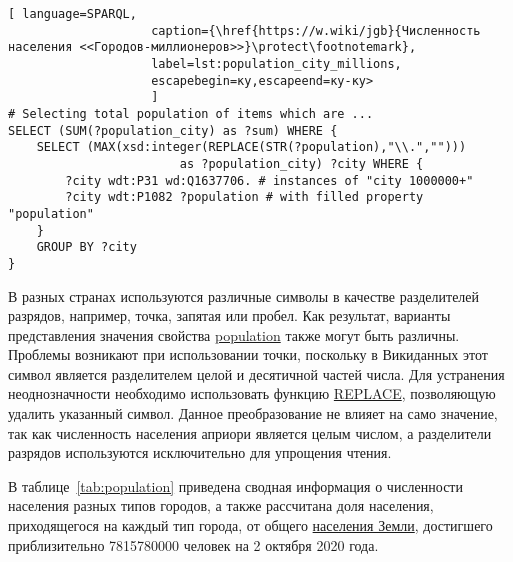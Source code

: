\newpage %

\begin{lstlisting}[ language=SPARQL, 
                    caption={\href{https://w.wiki/jgb}{Численность населения <<Городов-миллионеров>>}\protect\footnotemark},
                    label=lst:population_city_millions, 
                    escapebegin=ку,escapeend=ку-ку>
                    ]
# Selecting total population of items which are ...
SELECT (SUM(?population_city) as ?sum) WHERE {
	SELECT (MAX(xsd:integer(REPLACE(STR(?population),"\\.",""))) 
						as ?population_city) ?city WHERE {
		?city wdt:P31 wd:Q1637706. # instances of "city 1000000+"
		?city wdt:P1082 ?population # with filled property "population"
	}
	GROUP BY ?city
}
\end{lstlisting}

В разных странах используются различные символы в качестве разделителей разрядов, например, точка, запятая или пробел. Как результат, варианты представления значения свойства \href{https://www.wikidata.org/wiki/Property:P1082}{population} также могут быть различны. Проблемы возникают при использовании точки, поскольку в Викиданных этот символ является разделителем целой и десятичной частей числа. Для устранения неоднозначности необходимо использовать функцию \href{https://en.wikibooks.org/wiki/SPARQL/Expressions_and_Functions#REPLACE}{REPLACE}, позволяющую удалить указанный символ. Данное преобразование не влияет на само значение, так как численность населения априори является целым числом, а разделители разрядов используются исключительно для упрощения чтения.

В таблице~\ref{tab:population} приведена сводная информация о численности населения разных типов городов, а также рассчитана доля населения, приходящегося на каждый тип города, от общего \href{https://bit.ly/3pgnMss}{населения Земли}, достигшего приблизительно \num{7815780000} человек на 2 октября 2020 года.

